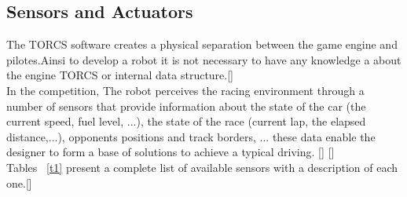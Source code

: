 \documentclass{llncs}
\begin{document}
\subsection{Sensors and Actuators}
The TORCS software creates a physical separation between the game engine and pilotes.Ainsi to develop a robot it is not necessary to have any knowledge a
about the engine TORCS or internal data structure.[\cite{torcs2012}]\\

In the competition, The robot perceives the racing environment through a number of sensors that provide information about the state of the car (the current speed, fuel level, ...), the state of the race (current lap, the elapsed distance,...), opponents positions and track borders, ... these data enable the designer to form a base of solutions to achieve a typical driving. [\cite{manuel}] [\cite{torcs2}]		\\		
Tables ~\ref{t1} present a complete list of available sensors with a description of each one.[\cite{Torcs3}]\\
\end{document}

